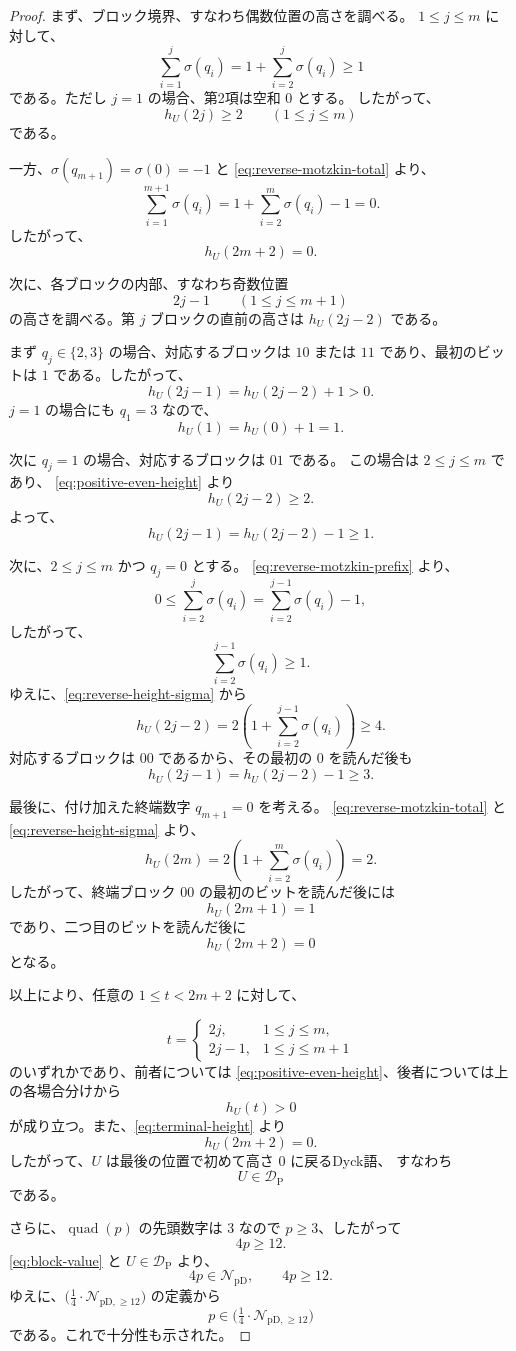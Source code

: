\documentclass[12pt]{ltjsarticle}
\theoremstyle{plain}
\theoremstyle{definition}
\theoremstyle{plain}
\newcommand{\NpD}{\mathcal{N}_{\mathrm{pD}}}
\newcommand{\DP}{\mathcal{D}_{\mathrm{P}}}
\newcommand{\Pset}{%
  \bigl(\tfrac{1}{4}\cdot\mathcal{N}_{\mathrm{pD},\geq 12}\bigr)%
}
\begin{document}
\begin{proof}
まず、ブロック境界、すなわち偶数位置の高さを調べる。
$1\leq j\leq m$ に対して、
\[
 \sum_{i=1}^{j}\sigma(q_i)
 =
 1+\sum_{i=2}^{j}\sigma(q_i)
 \geq1
\]
である。ただし $j=1$ の場合、第2項は空和 $0$ とする。
したがって、
\begin{equation}\label{eq:positive-even-height}
 h_U(2j)\geq2
 \qquad(1\leq j\leq m)
\end{equation}
である。

一方、$\sigma(q_{m+1})=\sigma(0)=-1$ と
\eqref{eq:reverse-motzkin-total} より、
\[
 \sum_{i=1}^{m+1}\sigma(q_i)
 =
 1+\sum_{i=2}^{m}\sigma(q_i)-1
 =0.
\]
したがって、
\begin{equation}\label{eq:terminal-height}
 h_U(2m+2)=0.
\end{equation}

次に、各ブロックの内部、すなわち奇数位置
\[
 2j-1\qquad(1\leq j\leq m+1)
\]
の高さを調べる。第 $j$ ブロックの直前の高さは
$h_U(2j-2)$ である。

まず $q_j\in\{2,3\}$ の場合、対応するブロックは $10$ または
$11$ であり、最初のビットは $1$ である。したがって、
\[
 h_U(2j-1)=h_U(2j-2)+1>0.
\]
$j=1$ の場合にも $q_1=3$ なので、
\[
 h_U(1)=h_U(0)+1=1.
\]

次に $q_j=1$ の場合、対応するブロックは $01$ である。
この場合は $2\leq j\leq m$ であり、
\eqref{eq:positive-even-height} より
\[
 h_U(2j-2)\geq2.
\]
よって、
\[
 h_U(2j-1)
 =h_U(2j-2)-1
 \geq1.
\]

次に、$2\leq j\leq m$ かつ $q_j=0$ とする。
\eqref{eq:reverse-motzkin-prefix} より、
\[
 0
 \leq\sum_{i=2}^{j}\sigma(q_i)
 =\sum_{i=2}^{j-1}\sigma(q_i)-1,
\]
したがって、
\[
 \sum_{i=2}^{j-1}\sigma(q_i)\geq1.
\]
ゆえに、\eqref{eq:reverse-height-sigma} から
\[
 h_U(2j-2)
 =
 2\left(
   1+\sum_{i=2}^{j-1}\sigma(q_i)
 \right)
 \geq4.
\]
対応するブロックは $00$ であるから、その最初の $0$ を読んだ後も
\[
 h_U(2j-1)
 =h_U(2j-2)-1
 \geq3.
\]

最後に、付け加えた終端数字 $q_{m+1}=0$ を考える。
\eqref{eq:reverse-motzkin-total} と
\eqref{eq:reverse-height-sigma} より、
\[
 h_U(2m)
 =
 2\left(
  1+\sum_{i=2}^{m}\sigma(q_i)
 \right)
 =2.
\]
したがって、終端ブロック $00$ の最初のビットを読んだ後には
\[
 h_U(2m+1)=1
\]
であり、二つ目のビットを読んだ後に
\[
 h_U(2m+2)=0
\]
となる。

以上により、任意の $1\leq t<2m+2$ に対して、

\[
 t=
 \begin{cases}
  2j,&1\leq j\leq m,\\
  2j-1,&1\leq j\leq m+1
 \end{cases}
\]
のいずれかであり、前者については
\eqref{eq:positive-even-height}、後者については上の各場合分けから
\[
 h_U(t)>0
\]
が成り立つ。また、\eqref{eq:terminal-height} より
\[
 h_U(2m+2)=0.
\]
したがって、$U$ は最後の位置で初めて高さ $0$ に戻るDyck語、
すなわち
\[
 U\in\DP
\]
である。

さらに、$\operatorname{quad}(p)$ の先頭数字は $3$ なので
$p\geq3$、したがって
\[
 4p\geq12.
\]
\eqref{eq:block-value} と $U\in\DP$ より、
\[
 4p\in\NpD,\qquad 4p\geq12.
\]
ゆえに、$\Pset$ の定義から
\[
 p\in\Pset
\]
である。これで十分性も示された。
\end{proof}
\end{document}
